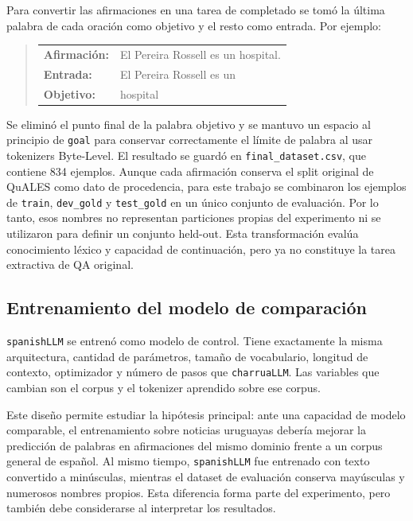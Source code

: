\documentclass[11pt,a4paper]{article}
\newcommand{\charrua}{\texttt{charruaLLM}}
\newcommand{\spanishmodel}{\texttt{spanishLLM}}
\newcommand{\code}[1]{\texttt{#1}}
\begin{document}
Para convertir las afirmaciones en una tarea de completado se tomó la última
palabra de cada oración como objetivo y el resto como entrada. Por ejemplo:

\begin{quote}
\begin{tabular}{@{}ll@{}}
    \textbf{Afirmación:} & El Pereira Rossell es un hospital. \\
    \textbf{Entrada:} & El Pereira Rossell es un \\
    \textbf{Objetivo:} & hospital
\end{tabular}
\end{quote}

Se eliminó el punto final de la palabra objetivo y se mantuvo un espacio al
principio de \code{goal} para conservar correctamente el límite de palabra al
usar tokenizers Byte-Level. El resultado se guardó en
\code{final\_dataset.csv}, que contiene 834 ejemplos. Aunque cada afirmación
conserva el split original de QuALES como dato de procedencia, para este trabajo
se combinaron los ejemplos de \code{train}, \code{dev\_gold} y \code{test\_gold}
en un único conjunto de evaluación. Por lo tanto, esos nombres no representan
particiones propias del experimento ni se utilizaron para definir un conjunto
held-out. Esta transformación evalúa conocimiento léxico y capacidad de
continuación, pero ya no constituye la tarea extractiva de QA original.


\subsection{Entrenamiento del modelo de comparación}

\spanishmodel{} se entrenó como modelo de control. Tiene exactamente la misma
arquitectura, cantidad de parámetros, tamaño de vocabulario, longitud de
contexto, optimizador y número de pasos que \charrua. Las variables que cambian
son el corpus y el tokenizer aprendido sobre ese corpus.

Este diseño permite estudiar la hipótesis principal: ante una capacidad de
modelo comparable, el entrenamiento sobre noticias uruguayas debería mejorar
la predicción de palabras en afirmaciones del mismo dominio frente a un corpus
general de español. Al mismo tiempo, \spanishmodel{} fue entrenado con texto
convertido a minúsculas, mientras el dataset de evaluación conserva mayúsculas
y numerosos nombres propios. Esta diferencia forma parte del experimento, pero
también debe considerarse al interpretar los resultados.
\end{document}
